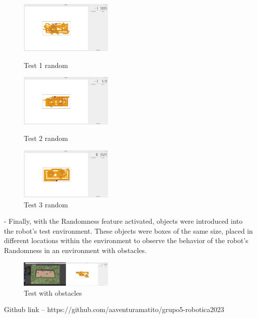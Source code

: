 \documentclass[conference]{IEEEtran}
\begin{document}
\begin{figure}
  \centering
  \includegraphics[width=0.4\textwidth]{test1con.jpg}
  \caption{Test 1 random}
  \label{fig:Test 1 con aleatoriedad}

  \vspace{1.0 cm}
  
  \centering
  \includegraphics[width=0.4\textwidth]{test2con.jpg}
  \caption{Test 2 random}
  \label{fig:Test 2 con aleatoriedad}

  \vspace{1.0 cm}

  \centering
  \includegraphics[width=0.4\textwidth]{test3con.jpg}
  \caption{Test 3 random}
  \label{fig:Test 3 con aleatoriedad}
  
\end{figure}

\vspace{3.0 cm}


- Finally, with the Randomness feature activated, objects were introduced into the robot's test environment. These objects were boxes of the same size, placed in different locations within the environment to observe the behavior of the robot's Randomness in an environment with obstacles.

\begin{figure}[!htb]
  \centering
  \includegraphics[width=0.4\textwidth]{objetos.jpg}
  \caption{Test with obstacles}
  \label{fig:Test con aleatoriedad y cajas}
\end{figure}

Github link -- https://github.com/aaventuramatito/grupo5-robotica2023
\end{document}
